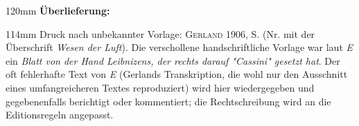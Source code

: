 %
\frenchspacing%
\begin{ledgroupsized}[r]{120mm}%
\footnotesize%
\pstart%
\noindent%
\textbf{Überlieferung:}%
\pend%
\end{ledgroupsized}%
\begin{ledgroupsized}[r]{114mm}%
\footnotesize%
\pstart%
\parindent -6mm%
%
Druck nach unbekannter Vorlage:
\textsc{Gerland} 1906, S.
(Nr. mit der Überschrift \textit{Wesen der Luft}).%
\cite{00197}
Die verschollene handschriftliche Vorlage war laut \textit{E} ein \textit{Blatt von der Hand Leibnizens, der rechts darauf "Cassini" gesetzt hat}.
Der oft fehlerhafte Text von \textit{E} (Gerlands Transkription, die wohl nur den Ausschnitt eines umfangreicheren Textes reproduziert) wird hier wiedergegeben und gegebenenfalls berichtigt oder kommentiert;
die Rechtschreibung wird an die Editionsregeln angepasst.
\pend%
\end{ledgroupsized}%
\vspace{5mm}%
